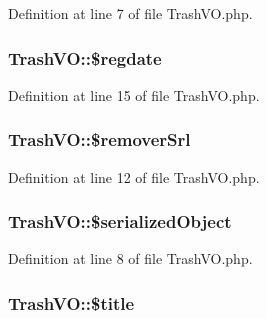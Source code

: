 Definition at line 7 of file Trash\+V\+O.\+php.

\subsubsection[{\texorpdfstring{\$regdate}{$regdate}}]{\setlength{\rightskip}{0pt plus 5cm}Trash\+V\+O\+::\$regdate}\hypertarget{classTrashVO_a54388f0f415f3e5c302eec871e790434}{}\label{classTrashVO_a54388f0f415f3e5c302eec871e790434}


Definition at line 15 of file Trash\+V\+O.\+php.

\subsubsection[{\texorpdfstring{\$remover\+Srl}{$removerSrl}}]{\setlength{\rightskip}{0pt plus 5cm}Trash\+V\+O\+::\$remover\+Srl}\hypertarget{classTrashVO_aa51410763a3b44a76853d8a347793903}{}\label{classTrashVO_aa51410763a3b44a76853d8a347793903}


Definition at line 12 of file Trash\+V\+O.\+php.

\subsubsection[{\texorpdfstring{\$serialized\+Object}{$serializedObject}}]{\setlength{\rightskip}{0pt plus 5cm}Trash\+V\+O\+::\$serialized\+Object}\hypertarget{classTrashVO_ac3834ed43d01357398d5a0d7f5a9c698}{}\label{classTrashVO_ac3834ed43d01357398d5a0d7f5a9c698}


Definition at line 8 of file Trash\+V\+O.\+php.

\subsubsection[{\texorpdfstring{\$title}{$title}}]{\setlength{\rightskip}{0pt plus 5cm}Trash\+V\+O\+::\$title}\hypertarget{classTrashVO_ac6f85be76ea94f3fde44e0527bdcadc1}{}\label{classTrashVO_ac6f85be76ea94f3fde44e0527bdcadc1}


